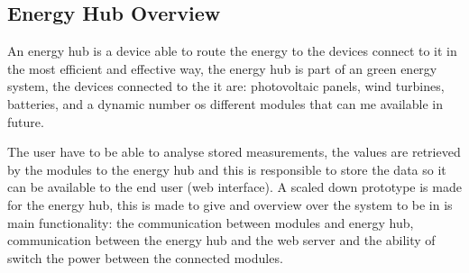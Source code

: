 \subsection{Energy Hub Overview}
An energy hub is a device able to route the energy to the devices connect to it in the most efficient and effective way, the energy hub is part of an green energy system, the devices connected to the it are: photovoltaic panels, wind turbines, batteries, and a dynamic number os different modules that can me available in future. 

The user have to be able to analyse stored measurements, the values are retrieved by the modules to the energy hub and this is responsible to store the data so it can be available to the end user (web interface). A scaled down prototype is made for the energy hub, this is made to give and overview over the system to be in is main functionality: the communication between modules and energy hub, communication between the energy hub and the web server and the ability of switch the power between the connected modules.